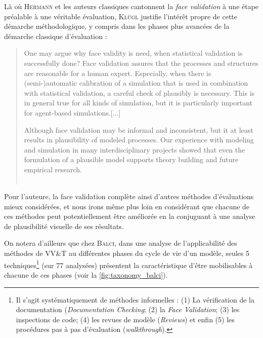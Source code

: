 Là où H\textsc{ermann} et les auteurs classiques cantonnent la \textit{face validation} à une étape préalable à une véritable évaluation, K\textsc{lügl} justifie l'intérêt propre de cette démarche méthodologique, y compris dans les phases plus avancées de la démarche classique d'évaluation :

\begin{quotation}
	\noindent \og One may argue why face validity is need, when statistical validation is successfully done? Face validation assures that the processes and structures are reasonable for a human expert. Especially, when there is (semi-)automatic calibration of a simulation that is used in combination with statistical validation, a careful check of plausibly is necessary. This is in general true for all kinds of simulation, but it is particularly important for agent-based simulations.[...]
	
	\noindent Although face validation may be informal and inconsistent, but it at least results in plausibility of modeled processes. Our experience with modeling and simulation in many interdisciplinary projects showed that even the formulation of a plausible model supports theory building and future empirical research.\fg{}\\
	\mbox{}~ \hfill \textcite[40;43]{klugl_validation_2008}
\end{quotation}


Pour l'auteure, la face validation complète ainsi d'autres méthodes d'évaluations mieux considérées, et nous irons même plus loin en considérant que chacune de ces méthodes peut potentiellement être améliorée en la conjuguant à une analyse de plausibilité visuelle de ses résultats.

On notera d'ailleurs que chez B\textsc{alci}, dans une analyse de l'applicabilité des méthodes de \og VV\&T\fg{} au différentes phases du cycle de vie d'un modèle, seules 5 techniques\footnote{
	Il s'agit systématiquement de méthodes \og informelles\fg{} : 
	(1) La vérification de la documentation (\textit{Documentation Checking}; (2) la \textit{Face Validation}; (3) les inspections de code; (4) les \og revues\fg{} de modèle (\textit{Reviews}) et enfin (5) les \og procédures pas à pas\fg{} d'évaluation (\textit{walkthrough}).
} (sur 77 analysées) présentent la caractéristique d'être mobilisables à chacune de ces phases (voir la \autoref{fig:taxonomy_balci}).


